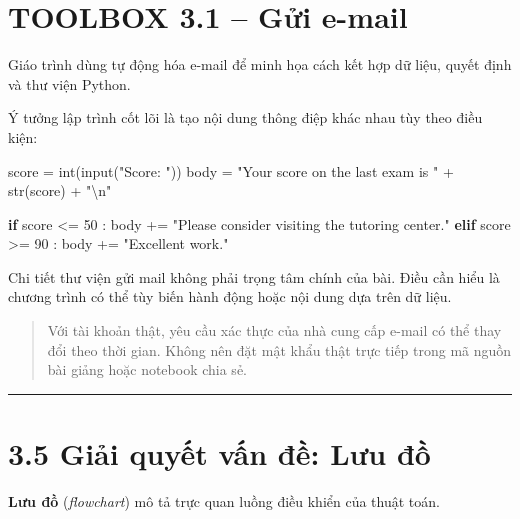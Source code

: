 \documentclass[
  11pt,
  a4paper,
]{article}
\newenvironment{Shaded}{}{}
\newcommand{\BuiltInTok}[1]{\textcolor[rgb]{0.00,0.50,0.00}{#1}}
\newcommand{\CharTok}[1]{\textcolor[rgb]{0.25,0.44,0.63}{#1}}
\newcommand{\ControlFlowTok}[1]{\textcolor[rgb]{0.00,0.44,0.13}{\textbf{#1}}}
\newcommand{\DecValTok}[1]{\textcolor[rgb]{0.25,0.63,0.44}{#1}}
\newcommand{\NormalTok}[1]{#1}
\newcommand{\OperatorTok}[1]{\textcolor[rgb]{0.40,0.40,0.40}{#1}}
\newcommand{\StringTok}[1]{\textcolor[rgb]{0.25,0.44,0.63}{#1}}
\begin{document}
\section{TOOLBOX 3.1 -- Gửi e-mail}\label{toolbox-3.1-gux1eedi-e-mail}

Giáo trình dùng tự động hóa e-mail để minh họa cách kết hợp dữ liệu,
quyết định và thư viện Python.

Ý tưởng lập trình cốt lõi là tạo nội dung thông điệp khác nhau tùy theo
điều kiện:

\begin{Shaded}
\begin{Highlighting}[]
\NormalTok{score }\OperatorTok{=} \BuiltInTok{int}\NormalTok{(}\BuiltInTok{input}\NormalTok{(}\StringTok{"Score: "}\NormalTok{))}
\NormalTok{body }\OperatorTok{=} \StringTok{"Your score on the last exam is "} \OperatorTok{+} \BuiltInTok{str}\NormalTok{(score) }\OperatorTok{+} \StringTok{"}\CharTok{\textbackslash{}n}\StringTok{"}

\ControlFlowTok{if}\NormalTok{ score }\OperatorTok{\textless{}=} \DecValTok{50}\NormalTok{ :}
\NormalTok{    body }\OperatorTok{+=} \StringTok{"Please consider visiting the tutoring center."}
\ControlFlowTok{elif}\NormalTok{ score }\OperatorTok{\textgreater{}=} \DecValTok{90}\NormalTok{ :}
\NormalTok{    body }\OperatorTok{+=} \StringTok{"Excellent work."}
\end{Highlighting}
\end{Shaded}

Chi tiết thư viện gửi mail không phải trọng tâm chính của bài. Điều cần
hiểu là chương trình có thể tùy biến hành động hoặc nội dung dựa trên dữ
liệu.

\begin{quote}
Với tài khoản thật, yêu cầu xác thực của nhà cung cấp e-mail có thể thay
đổi theo thời gian. Không nên đặt mật khẩu thật trực tiếp trong mã nguồn
bài giảng hoặc notebook chia sẻ.
\end{quote}

\begin{center}\rule{0.5\linewidth}{0.5pt}\end{center}

\section{3.5 Giải quyết vấn đề: Lưu
đồ}\label{giux1ea3i-quyux1ebft-vux1ea5n-ux111ux1ec1-lux1b0u-ux111ux1ed3}

\textbf{Lưu đồ} (\emph{flowchart}) mô tả trực quan luồng điều khiển của
thuật toán.
\end{document}
